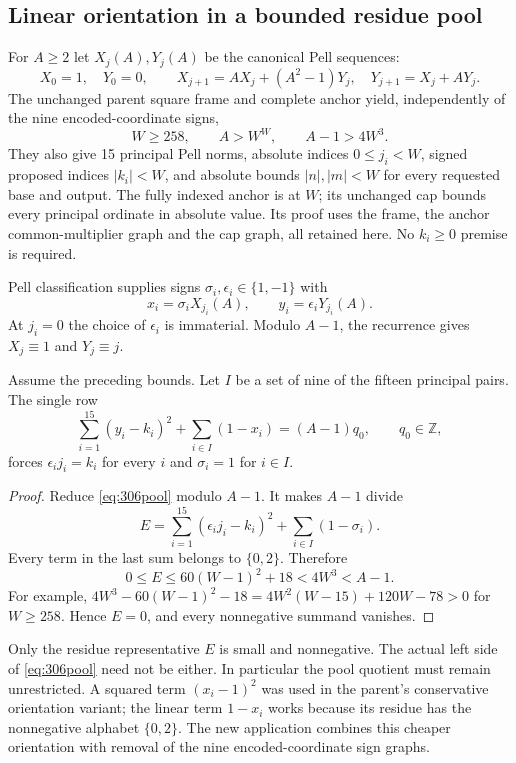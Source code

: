 \subsection{Linear orientation in a bounded residue pool}

For $A\geq2$ let $X_j(A),Y_j(A)$ be the canonical Pell sequences:
\[
 X_0=1,\quad Y_0=0,\qquad
 X_{j+1}=AX_j+(A^2-1)Y_j,\quad Y_{j+1}=X_j+AY_j.
\]
The unchanged parent square frame and complete anchor yield, independently
of the nine encoded-coordinate signs,
\begin{equation}\label{eq:306frame}
 W\geq258,\qquad A>W^W,\qquad A-1>4W^3.
\end{equation}
They also give 15 principal Pell norms, absolute indices $0\leq j_i<W$,
signed proposed indices $|k_i|<W$, and absolute bounds $|n|,|m|<W$ for
every requested base and output.  The fully indexed anchor is at $W$;
its unchanged cap bounds every principal ordinate in absolute value.
Its proof uses the frame, the anchor common-multiplier graph and the cap
graph, all retained here.  No $k_i\geq0$ premise is required.

Pell classification supplies signs $\sigma_i,\epsilon_i\in\{1,-1\}$ with
\[
 x_i=\sigma_iX_{j_i}(A),\qquad y_i=\epsilon_iY_{j_i}(A).
\]
At $j_i=0$ the choice of $\epsilon_i$ is immaterial.  Modulo $A-1$,
the recurrence gives $X_j\equiv1$ and $Y_j\equiv j$.

\begin{lemma}\label{lem:306pool}
Assume the preceding bounds.  Let $I$ be a set of nine of the fifteen
principal pairs.  The single row
\begin{equation}\label{eq:306pool}
 \sum_{i=1}^{15}(y_i-k_i)^2+\sum_{i\in I}(1-x_i)=(A-1)q_0,
 \qquad q_0\in\mathbb Z,
\end{equation}
forces $\epsilon_i j_i=k_i$ for every $i$ and $\sigma_i=1$ for $i\in I$.
\end{lemma}

\begin{proof}
Reduce \eqref{eq:306pool} modulo $A-1$.  It makes $A-1$ divide
\[
 E=\sum_{i=1}^{15}(\epsilon_i j_i-k_i)^2+
     \sum_{i\in I}(1-\sigma_i).
\]
Every term in the last sum belongs to $\{0,2\}$.  Therefore
\[
 0\leq E\leq60(W-1)^2+18<4W^3<A-1.
\]
For example,
$4W^3-60(W-1)^2-18=4W^2(W-15)+120W-78>0$ for $W\geq258$.
Hence $E=0$, and every nonnegative summand vanishes.
\end{proof}

Only the residue representative $E$ is small and nonnegative.  The actual
left side of \eqref{eq:306pool} need not be either.  In particular the pool
quotient must remain unrestricted.  A squared term $(x_i-1)^2$ was used
in the parent's conservative orientation variant; the linear term
$1-x_i$ works because its residue has the nonnegative alphabet $\{0,2\}$.
The new application combines this cheaper orientation with removal of
the nine encoded-coordinate sign graphs.

